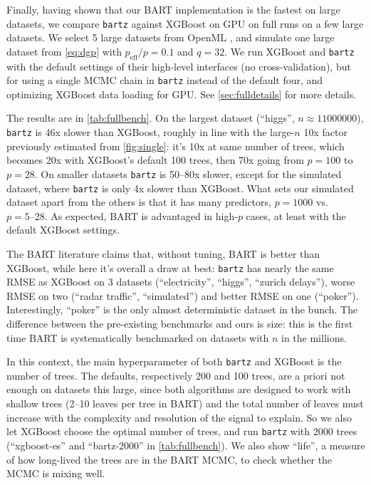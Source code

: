 \documentclass{article}
\begin{document}
Finally, having shown that our BART implementation is the fastest on large datasets,
we compare \texttt{bartz} against XGBoost on GPU
on full runs on a few large datasets. We select 5 large datasets from OpenML \autocite{OpenML2025},
and simulate one large dataset from \autoref{eq:dgp} with $p_\text{eff}/p =
0.1$ and $q=32$. We run XGBoost and \texttt{bartz} with the default settings of their
high-level interfaces (no cross-validation), but for using a single MCMC chain in \texttt{bartz} instead of
the default four, and optimizing XGBoost data loading for GPU. See \autoref{sec:fulldetails} for more details.
 
The results are in \autoref{tab:fullbench}.
On the largest dataset (``higgs'',
$n\approx\num{11000000}$), \texttt{bartz} is 46x slower than XGBoost, roughly in line
with the large-$n$ 10x factor previously estimated from \autoref{fig:single}:
it's 10x at same number of trees, which becomes 20x with XGBoost's default 100 trees, then 70x going from $p=100$ to $p=28$.
On smaller datasets \texttt{bartz} is 50--80x slower, except for the simulated
dataset, where \texttt{bartz} is only 4x slower than XGBoost. What sets our simulated dataset
apart from the others is that it has many predictors, $p=1000$ vs.{}
$p=\numrange{5}{28}$. As expected, BART is advantaged in high-$p$ cases, at
least with the default XGBoost settings.

The BART literature claims that, without tuning, BART is better than XGBoost,
while here it's overall a draw at best: \texttt{bartz} has nearly the same RMSE as XGBoost on 3
datasets (``electricity'', ``higgs'', ``zurich delays''), worse RMSE on two
(``radar traffic'', ``simulated'') and better RMSE on one (``poker'').
Interestingly, ``poker'' is the only
almost deterministic dataset in the bunch. The difference between the
pre-existing benchmarks and ours is size: this is the first time BART is
systematically benchmarked on datasets with $n$ in the millions.

In this context, the main hyperparameter of both \texttt{bartz} and XGBoost is the
number of trees. The defaults, respectively 200 and 100 trees, are a priori not
enough on datasets this large, since both algorithms are designed to work with
shallow trees (2--10 leaves per tree in BART) and the total number of leaves
must increase with the complexity and resolution of the signal to explain. So
we also let XGBoost choose the optimal number of trees, and run \texttt{bartz} with 2000
trees (``xgboost-es'' and ``bartz-2000'' in \autoref{tab:fullbench}). We also
show ``life'', a measure of how long-lived the trees are in the BART MCMC, to
check whether the MCMC is mixing well.
\end{document}
